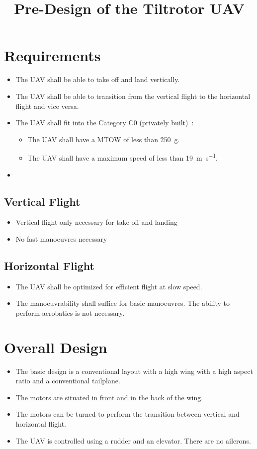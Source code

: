 \documentclass[a4paper,12pt]{scrartcl}
\title{Pre-Design of the Tiltrotor UAV}
\begin{document}
\maketitle
\tableofcontents

\newpage

\section{Requirements}
\begin{itemize}
	\item The UAV shall be able to take off and land vertically.
	\item The UAV shall be able to transition from the vertical flight to the horizontal flight and vice versa.
	\item The UAV shall fit into the Category C0 (privately built)~\cite{tabelle-lba-drohnenfuehrerschein}:
		\begin{itemize}
			\item The UAV shall have a MTOW of less than \SI{250}{\gram}.
			\item The UAV shall have a maximum speed of less than \SI{19}{\metre\per\second}.
		\end{itemize}
	\item 
\end{itemize}

\subsection{Vertical Flight}
\begin{itemize}
	\item Vertical flight only necessary for take-off and landing
	\item No fast manoeuvres necessary
\end{itemize}


\subsection{Horizontal Flight}
\begin{itemize}
	\item The UAV shall be optimized for efficient flight at slow speed.
	\item The manoeuvrability shall suffice for basic manoeuvres. The ability to perform acrobatics is not necessary.
\end{itemize}

\section{Overall Design}
\begin{itemize}
	\item The basic design is a conventional layout with a high wing with a high aspect ratio and a conventional tailplane.
	\item The motors are situated in front and in the back of the wing.
	\item The motors can be turned to perform the transition between vertical and horizontal flight.
	\item The UAV is controlled using a rudder and an elevator. There are no ailerons.
\end{itemize}
\end{document}
